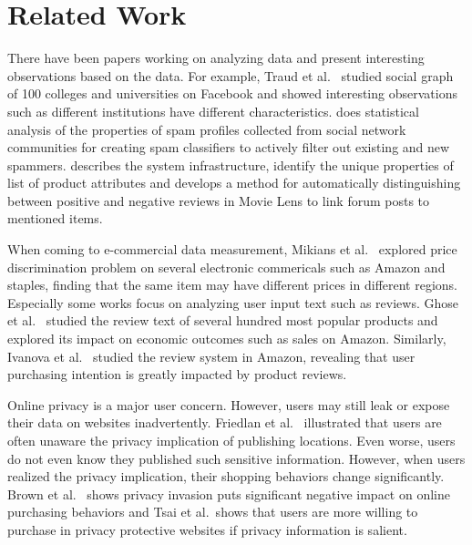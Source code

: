 \section{Related Work}

There have been papers working on analyzing data and present interesting observations based on the data. For example, Traud et al.~\cite{traud2012social} studied social graph of 100 colleges and universities on Facebook and showed interesting observations such as different institutions have different characteristics. \cite{Lee:2010:USS:1835449.1835522} does statistical analysis of the properties of spam profiles collected from social network communities for creating spam classifiers to actively filter out existing and new spammers. \cite{dave2003mining} describes the system infrastructure, identify the unique properties of list of product attributes and develops a method for automatically distinguishing between positive and negative reviews in Movie Lens to link forum posts to mentioned items. 

When coming to e-commercial data measurement, Mikians et al.~\cite{mikians2012detecting} explored price discrimination problem on several electronic commericals such as Amazon and staples, finding that the same item may have different prices in different regions. Especially some works focus on analyzing user input text such as reviews. Ghose et al.~\cite{ghose2011estimating} studied the review text of several hundred most popular products and explored its impact on economic outcomes such as sales on Amazon. Similarly, Ivanova et al.~\cite{ivanova2013does} studied the review system in Amazon, revealing that user purchasing intention is greatly impacted by product reviews. 

Online privacy is a major user concern. However, users may still leak or expose their data on websites inadvertently. Friedlan et al.~\cite{friedland2010cybercasing} illustrated that users are often unaware the privacy implication of publishing locations. Even worse, users do not even know they published such sensitive information. However, when users realized the privacy implication, their shopping behaviors change significantly. Brown et al.~\cite{brown2004investigating} shows privacy invasion puts significant negative impact on online purchasing behaviors and Tsai et al.~\cite{tsai2011effect}shows that users are more willing to purchase in privacy protective websites if privacy information is salient.

